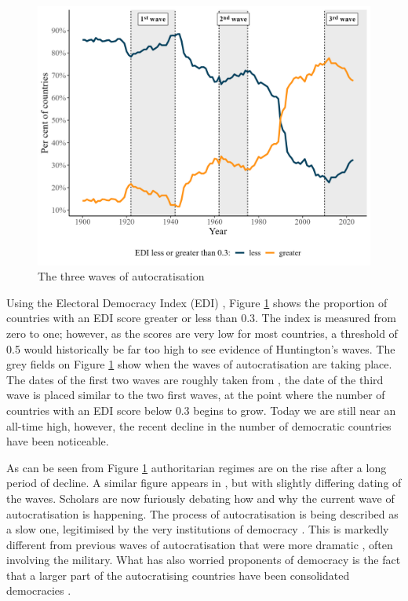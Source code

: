 \begin{figure}[hbt!]
\centering
\includegraphics[width = \textwidth]{waves.jpeg}
\caption{\label{fig:autocratisation}The three waves of autocratisation}
\end{figure}

Using the Electoral Democracy Index (EDI) \citep{coppedge_v-dem_2025}, Figure \ref{fig:autocratisation} shows the proportion of countries with an EDI score greater or less than 0.3. The index is measured from zero to one; however, as the scores are very low for most countries, a threshold of 0.5 would historically be far too high to see evidence of Huntington's waves. The grey fields on Figure \ref{fig:autocratisation} show when the waves of autocratisation are taking place. The dates of the first two waves are roughly taken from \citet[p.16]{huntington_third_1991} , the date of the third wave is placed similar to the two first waves, at the point where the number of countries with an EDI score below 0.3 begins to grow. Today we are still near an all-time high, however, the recent decline in the number of democratic countries have been noticeable. 

As can be seen from Figure \ref{fig:autocratisation} authoritarian regimes are on the rise after a long period of decline. A similar figure appears in \citet{luhrmann_third_2019}, but with slightly differing dating of the waves. Scholars are now furiously debating how and why the current wave of autocratisation is happening. The process of autocratisation is being described as a slow one, legitimised by the very institutions of democracy \citep{varol_stealth_2015, bermeo_democratic_2016, luhrmann_third_2019}. This is markedly different from previous waves of autocratisation that were more dramatic \citep[pp. 6-8]{bermeo_democratic_2016}, often involving the military. What has also worried proponents of democracy is the fact that a larger part of the autocratising countries have been consolidated democracies \citep{luhrmann_third_2019}. 

